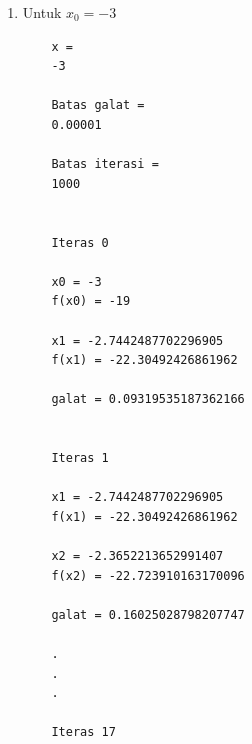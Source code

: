\documentclass[12pt]{article}
\begin{document}
\begin{enumerate}
{\begin{enumerate}
{\begin{enumerate}
{\begin{lstlisting}
    Batas galat =
    0.00001
    
    Batas iterasi =
    1000
    
    
    Iteras 0
    
    x0 = 1
    f(x0) = 1
    
    x1 = 0.8735804647362988
    f(x1) = -0.4335949224054252
    
    galat = 0.14471424255333196
    
    
    Iteras 1
    
    x1 = 0.8735804647362988
    f(x1) = -0.4335949224054252
    
    x2 = 0.93262920676064
    f(x2) = 0.1856033326436215
    
    galat = 0.06331427495117692
    
    .
    .
    .
    
    Iteras 12
    
    x12 = 0.9157548534009559
    f(x12) = 0.000039532295601496514
    
    x13 = 0.9157496155450033
    f(x13) = -0.00001697223888941224
    
    galat = 0.0000057197468211931175
    
    
    Solusi akhir = 0.9157548534009559
                        \end{lstlisting}
                        Diperoleh hasil akhir $ x = 0.9157548534009559 $
                    }
                    \item {
                        Untuk $ x_0 = -3 $
                        \begin{lstlisting}
    x =
    -3
    
    Batas galat =
    0.00001
    
    Batas iterasi =
    1000
    
    
    Iteras 0
    
    x0 = -3
    f(x0) = -19
    
    x1 = -2.7442487702296905
    f(x1) = -22.30492426861962
    
    galat = 0.09319535187362166
    
    
    Iteras 1
    
    x1 = -2.7442487702296905
    f(x1) = -22.30492426861962
    
    x2 = -2.3652213652991407
    f(x2) = -22.723910163170096
    
    galat = 0.16025028798207747
    
    .
    .
    .
    
    Iteras 17
    

\end{lstlisting}}
\end{enumerate}}
\end{enumerate}}
\end{enumerate}
\end{document}
